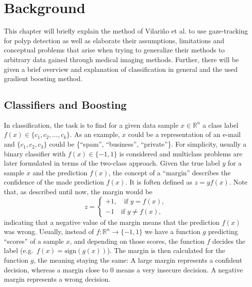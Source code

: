 \chapter{Background}
\label{chap:background}
This chapter will briefly explain the method of Vilari\~no et al. \cite{vilarino2007automatic} to use gaze-tracking for polyp detection as well as elaborate their assumptions, limitations and conceptual problems that arise when trying to generalize their methods to arbitrary data gained through medical imaging methods. Further, there will be given a brief overview and explanation of classification in general and the used gradient boosting method.

\section{Classifiers and Boosting}
In classification, the task is to find for a given data sample $x \in \mathbb{R}^n$ a class label $f(x) \in \{c_1, c_2, ..., c_k\}$. As an example, $x$ could be a representation of an e-mail and $\{c_1,c_2,c_3\}$ could be \{``spam'', ``business'', ``private''\}. For simplicity, usually a binary classifier with $f(x) \in \{-1,1\}$ is considered and multiclass problems are later formulated in terms of the two-class approach. 
Given the true label $y$ for a sample $x$ and the prediction $f(x)$, the concept of a ``margin'' describes the confidence of the made prediction $f(x).$ 
It is foften defined as $z = y f(x)$.
Note that, as described until now, the margin would be
\begin{equation*}
z = 
     \begin{cases}
	+1, \quad \text{if } y = f(x), \\
	-1 \quad \text{if } y \neq f(x),
      \end{cases}
\end{equation*}
indicating that a negative value of the margin means that the prediction $f(x)$ was wrong. Usually, instead of $f: \mathbb{R}^n \longrightarrow \{-1,1\}$ we have a function $g$ predicting ``scores'' of a sample $x$, and depending on those scores, the function $f$ decides the label (e.g.\ $f(x) = \text{sign}(g(x))$). The margin is then calculated for the function $g$, the meaning staying the same: A large margin represents a confident decision, whereas a margin close to $0$ means a very insecure decision. A negative margin represents a wrong decision.

